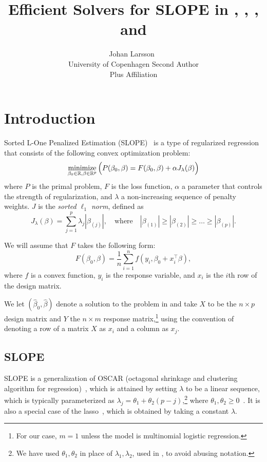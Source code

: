\documentclass[article]{jss}
\author{Johan Larsson~\orcidlink{0000-0002-4029-5945}\\University of Copenhagen
   \And Second Author\\Plus Affiliation}
\title{Efficient Solvers for SLOPE in \proglang{R}, \proglang{Python}, \proglang{Julia}, and \proglang{C++}}
\let\Cref\crtCref
\begin{document}
\section{Introduction}

Sorted L-One Penalized Estimation
(SLOPE)~\citep{bogdan2013,zeng2014,bogdan2015} is a type of
regularized regression that consists of the following convex optimization problem:
\begin{equation}
  \label{eq:slope}
  \operatorname*{minimize}_{\beta_0 \in \mathbb{R},\beta \in \mathbb{R}^p}
  \Big(
  P(\beta_0,\beta)
  = F(\beta_0, \beta) + \alpha J_{\lambda}(\beta)
  \Big)
\end{equation}
where \(P\) is the primal problem, \(F\) is the loss function, \(\alpha\) a parameter
that controls the strength of regularization, and \(\lambda\) a non-increasing sequence of penalty weights. \(J\) is the
\emph{sorted $\ell_1$ norm}, defined as
\begin{equation}
  \label{eq:sl1}
  J_{\lambda}(\beta) = \sum_{j=1}^p \lambda_j |\beta_{(j)}|, \quad
  \text{where}\quad |\beta_{(1)}| \geq |\beta_{(2)}| \geq \ldots \geq
  |\beta_{(p)}|.
\end{equation}

We will assume that \(F\) takes the following form:
\[
  F(\beta_0, \beta) = \frac{1}{n} \sum_{i=1}^n f(y_i, \beta_0 + x_i^\intercal \beta),
\]
where \(f\) is a convex function, \(y_i\) is the response variable, and
\(x_i\) is the \(i\)th row of the design matrix.

We let \((\hat{\beta}_0, \hat{\beta})\) denote a solution to the problem in \Cref{eq:slope}
and take \(X\) to be the \(n \times p\) design matrix and \(Y\) the
\(n \times m\) response matrix,\footnote{For our case, \(m = 1\) unless
  the model is multinomial logistic regression.} using the convention
of denoting a row of a matrix \(X\) as \(x_i\) and a column as \(x_j\).

\subsection{SLOPE}

SLOPE is a generalization of OSCAR (octagonal shrinkage and clustering
algorithm for regression)~\citep{bondell2008}, which is attained by
setting \(\lambda\) to be a linear sequence, which is typically parameterized as
\(\lambda_j = \theta_1 + \theta_2(p - j)\),\footnote{We have used \(\theta_1,\theta_2\) in place of
  \(\lambda_1,\lambda_2\), used in \citet{bondell2008}, to avoid abusing notation.} where \(\theta_1, \theta_2
\geq 0\)~\citep{figueiredo2014}. It is also a special case of
the lasso~\citep{santosa1986,donoho1994,donoho1995,tibshirani1996},
which is obtained by taking a constant \(\lambda\).
\end{document}
